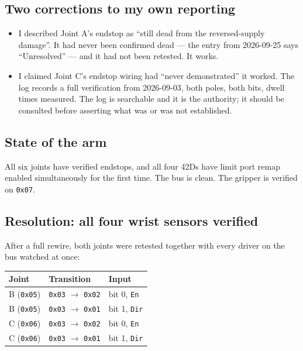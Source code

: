 \documentclass[11pt,letterpaper]{article}
\begin{document}
\subsection{Two corrections to my own reporting}
\begin{itemize}
    \item I described Joint A's endstop as ``still dead from the reversed-supply
    damage''. It had never been confirmed dead --- the entry from 2026-09-25
    says ``Unresolved'' --- and it had not been retested. It works.
    \item I claimed Joint C's endstop wiring had ``never demonstrated'' it
    worked. The log records a full verification from 2026-09-03, both poles,
    both bits, dwell times measured. The log is searchable and it is the
    authority; it should be consulted before asserting what was or was not
    established.
\end{itemize}

\subsection{State of the arm}
All six joints have verified endstops, and all four 42Ds have limit port remap
enabled simultaneously for the first time. The bus is clean. The gripper is
verified on \texttt{0x07}.

\subsection{Resolution: all four wrist sensors verified}
After a full rewire, both joints were retested together with every driver on the
bus watched at once:

\begin{center}
\begin{tabular}{lll}
\toprule
\textbf{Joint} & \textbf{Transition} & \textbf{Input} \\ \midrule
B (\texttt{0x05}) & \texttt{0x03} $\rightarrow$ \texttt{0x02} & bit 0, \texttt{En} \\
B (\texttt{0x05}) & \texttt{0x03} $\rightarrow$ \texttt{0x01} & bit 1, \texttt{Dir} \\
C (\texttt{0x06}) & \texttt{0x03} $\rightarrow$ \texttt{0x02} & bit 0, \texttt{En} \\
C (\texttt{0x06}) & \texttt{0x03} $\rightarrow$ \texttt{0x01} & bit 1, \texttt{Dir} \\
\bottomrule
\end{tabular}
\end{center}
\end{document}
